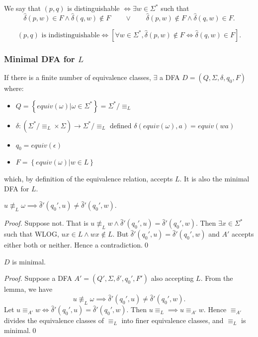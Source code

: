 \begin{definition}
  We say that $(p,q)$ is distinguishable $\iff\exists w\in \Sigma^{*}$ such that
  \[\hat{\delta}\left( p,w \right)\in F\wedge \hat{\delta}\left( q,w \right)
  \notin F\qquad\vee\qquad\hat{\delta}\left( p,w \right)\notin F\wedge
\hat{\delta}\left( q,w \right) \in F.\] 
\end{definition}
\begin{remark}
  \[(p,q)\text{ is indistinguishable}\iff \left[ \forall w\in \Sigma^{*},
  \hat{\delta}\left( p,w \right)\notin F\iff \hat{\delta}\left( q,w \right) \in
F\right].\] 
\end{remark}

\subsubsection{Minimal DFA for $L$}
If there is a finite number of equivalence classes, $\exists$ a DFA $D=\left(
Q,\Sigma,\delta,q_0,F\right)$ where:
\begin{itemize}
  \item $Q=\left\{ equiv\left( \omega \right) | \omega\in \Sigma^{*} \right\}=\Sigma^{*}/\equiv_L$
  \item $\delta:(\Sigma^{*}/\equiv_L \times \Sigma)\to \Sigma^{*}/\equiv_L$ defined
    $\delta\left( equiv(\omega),a \right) =equiv(wa)$
  \item $q_0=equiv(\epsilon)$
  \item $F=\left\{ equiv(\omega) | w\in L \right\}$
\end{itemize}
which, by definition of the equivalence relation, accepts $L$. It is also the
minimal DFA for $L$.

\begin{lemma}
  $u \not\equiv_L \omega\implies \hat{\delta}'\left( q_0',u \right) \neq
  \hat{\delta}'\left( q_0',w \right) $.
\end{lemma}
\begin{proof}
  Suppose not. That is $u\not \equiv_L
  w\wedge\hat{\delta}'\left( q_0',u \right) = \hat{\delta}'\left( q_0',w
  \right)$. Then $\exists x\in \Sigma^{*}$ such that WLOG, $ux\in L\wedge
  wx\notin L$. But $\hat{\delta}'\left( q_0',u \right) = \hat{\delta}'\left(
  q_0',w \right)$ and $A'$ accepts either both or neither. Hence a
  contradiction.\qed%
\end{proof}

\begin{prop}
  $D$ is minimal.
\end{prop}
\begin{proof}
  Suppose a DFA $A'=\left( Q',\Sigma,\delta',q_0',F' \right) $ also accepting
  $L$. From the lemma, we have
  \[u \not\equiv_L \omega\implies \hat{\delta}'\left( q_0',u \right) \neq
  \hat{\delta}'\left( q_0',w \right).\]
  Let $u\equiv_{A'}w\iff\hat{\delta}'\left( q_0',u \right) =
  \hat{\delta}'\left( q_0',w \right)$. Then $u\equiv_L \implies u\equiv_{A'}
  w$. Hence $\equiv_{A'}$ divides the equivalence classes of $\equiv_{L}$ into
  finer equivalence classes, and $\equiv_L$ is minimal.\qed%
\end{proof}

